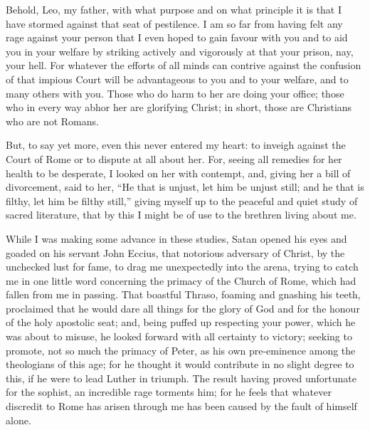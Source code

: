 Behold, Leo, my father, with what purpose and on what principle it is that
I have stormed against that seat of pestilence. I am so far from having
felt any rage against your person that I even hoped to gain favour with
you and to aid you in your welfare by striking actively and vigorously at
that your prison, nay, your hell. For whatever the efforts of all minds
can contrive against the confusion of that impious Court will be
advantageous to you and to your welfare, and to many others with you.
Those who do harm to her are doing your office; those who in every way
abhor her are glorifying Christ; in short, those are Christians who are
not Romans.

But, to say yet more, even this never entered my heart: to inveigh against
the Court of Rome or to dispute at all about her. For, seeing all remedies
for her health to be desperate, I looked on her with contempt, and, giving
her a bill of divorcement, said to her, ``He that is unjust, let him be
unjust still; and he that is filthy, let him be filthy still,'' giving
myself up to the peaceful and quiet study of sacred literature, that by
this I might be of use to the brethren living about me.

While I was making some advance in these studies, Satan opened his eyes
and goaded on his servant John Eccius, that notorious adversary of Christ,
by the unchecked lust for fame, to drag me unexpectedly into the arena,
trying to catch me in one little word concerning the primacy of the Church
of Rome, which had fallen from me in passing. That boastful Thraso,
foaming and gnashing his teeth, proclaimed that he would dare all things
for the glory of God and for the honour of the holy apostolic seat; and,
being puffed up respecting your power, which he was about to misuse, he
looked forward with all certainty to victory; seeking to promote, not so
much the primacy of Peter, as his own pre-eminence among the theologians
of this age; for he thought it would contribute in no slight degree to
this, if he were to lead Luther in triumph. The result having proved
unfortunate for the sophist, an incredible rage torments him; for he feels
that whatever discredit to Rome has arisen through me has been caused by
the fault of himself alone.

